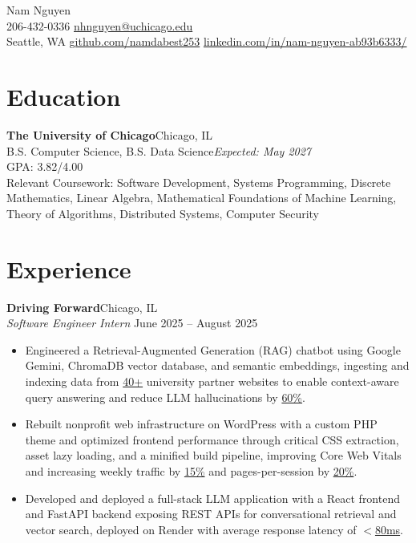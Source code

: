 \documentclass[10pt]{article}
\begin{document}
\begin{center}
    {\LARGE Nam Nguyen} \\[0.5ex]
    206-432-0336 \textbar{} \href{mailto:nhnguyen@uchicago.edu}
    {nhnguyen@uchicago.edu} \\[0.5ex]
    {Seattle, WA} \textbar{}
    \href{https://github.com/namdabest253}{github.com/namdabest253} \textbar{} 
    \href{https://www.linkedin.com/in/nam-nguyen-ab93b6333/}{linkedin.com/in/nam-nguyen-ab93b6333/}
\end{center}

\section*{Education}
\textbf{The University of Chicago}\hfill Chicago, IL\\
B.S. Computer Science, B.S. Data Science\hfill \textit{Expected: May 2027}\\
GPA: 3.82/4.00 \\ Relevant Coursework: Software Development, Systems Programming, Discrete Mathematics, Linear Algebra, Mathematical Foundations of Machine Learning, Theory of Algorithms, Distributed Systems, Computer Security

\section*{Experience}

\textbf{Driving Forward}\hfill Chicago, IL\\
\textit{Software Engineer Intern} \hfill June 2025 -- August 2025
\begin{itemize}
    \item Engineered a Retrieval-Augmented Generation (RAG) chatbot using Google Gemini, ChromaDB vector database, and semantic embeddings, ingesting and indexing data from \underline{40+} university partner websites to enable context-aware query answering and reduce LLM hallucinations by \underline{60\%}.
    \item Rebuilt nonprofit web infrastructure on WordPress with a custom PHP theme and optimized frontend performance through critical CSS extraction, asset lazy loading, and a minified build pipeline, improving Core Web Vitals and increasing weekly traffic by \underline{15\%} and pages-per-session by \underline{20\%}.
    \item Developed and deployed a full-stack LLM application with a React frontend and FastAPI backend exposing REST APIs for conversational retrieval and vector search, deployed on Render with average response latency of \underline{$<$80ms}.
\end{itemize}
\end{document}
